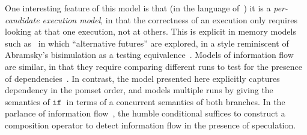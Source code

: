 
One interesting feature of this model is that (in the language
of~\cite{Pichon-Pharabod:2016:CSR:2837614.2837616}) it is a
\emph{per-candidate execution model}, in that the correctness of an
execution only requires looking at that one execution, not at
others. This is explicit in memory models such
as~\cite{Jagadeesan:2010:GOS:2175486.2175503,Kang:2017:PSR:3009837.3009850} in which
``alternative futures'' are explored, in a style reminiscent of
Abramsky's bisimulation as a testing equivalence~\cite{ABRAMSKY1987225}. Models of
information flow are similar, in that they require comparing different
runs to test for the presence of dependencies~\cite{Clarkson:2010:HYP:1891823.1891830}. In contrast, the model
presented here explicitly captures dependency in the pomset order, and
models multiple runs by giving the semantics of $\texttt{if}\,$ in terms of a
concurrent semantics of both branches.
In the parlance of information flow~\cite{Barthe:2004:SIF:1009380.1009669},
the humble conditional suffices to construct a composition operator to detect information flow  in the presence of speculation.
